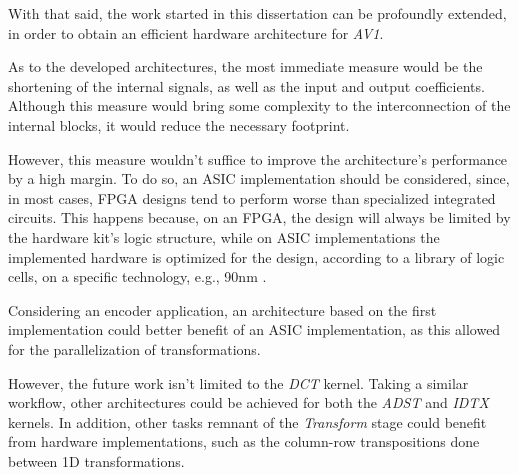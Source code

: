 With that said, the work started in this dissertation can be profoundly extended, in order to obtain an efficient hardware architecture for \emph{AV1}.

As to the developed architectures, the most immediate measure would be the shortening of the internal signals, as well as the input and output coefficients. Although this measure would bring some complexity to the interconnection of the internal blocks, it would reduce the necessary footprint.

However, this measure wouldn't suffice to improve the architecture's performance by a high margin. To do so, an ASIC implementation should be considered, since, in most cases, FPGA designs tend to perform worse than specialized integrated circuits. This happens because, on an FPGA, the design will always be limited by the hardware kit's logic structure, while on ASIC implementations the implemented hardware is optimized for the design, according to a library of logic cells, on a specific technology, e.g., 90nm \cite{FPGAVsASIC2016}.

Considering an encoder application, an architecture based on the first implementation could better benefit of an ASIC implementation, as this allowed for the parallelization of transformations.

However, the future work isn't limited to the \emph{DCT} kernel. Taking a similar workflow, other architectures could be achieved for both the \emph{ADST} and \emph{IDTX} kernels. In addition, other tasks remnant of the \emph{Transform} stage could benefit from hardware implementations, such as the column-row transpositions done between 1D transformations.

\clearpage
\printbibliography[heading=subbibliography]
